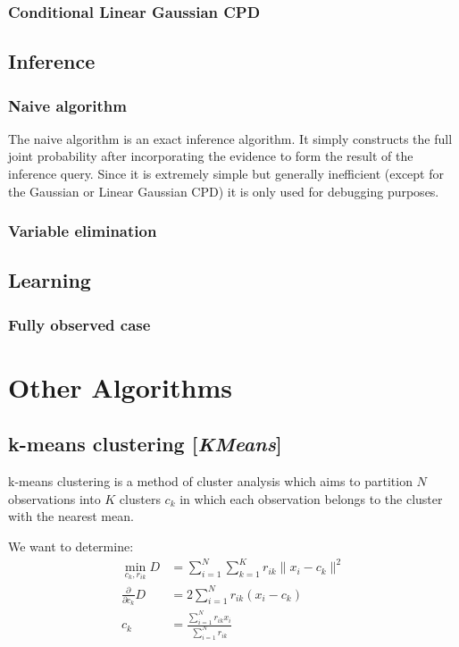\documentclass[11pt]{article}
\newcommand{\nllref}[1]{[\small{\textit{#1}}]}
\newcommand{\norm}[1]{\| #1 \|}
\begin{document}
\subsubsection{Conditional Linear Gaussian CPD}
\subsection{Inference}
\subsubsection{Naive algorithm}
The naive algorithm is an exact inference algorithm. It simply constructs the full joint probability after incorporating the evidence to form the result of the inference query. Since it is extremely simple but generally inefficient (except for the Gaussian or Linear Gaussian CPD) it is only used for debugging purposes.

\subsubsection{Variable elimination}
\subsection{Learning}
\subsubsection{Fully observed case}

\section{Other Algorithms}
\subsection{k-means clustering \nllref{KMeans}}
k-means clustering is a method of cluster analysis which aims to partition $N$ observations into $K$ clusters $c_k$ in which each observation belongs to the cluster with the nearest mean.

We want to determine:
\begin{align}
\min_{c_k,r_{ik}} D &= \sum_{i=1}^N\sum_{k=1}^K r_{ik} \norm{x_i-c_k}^2\nonumber\\
\frac{\partial}{\partial c_k}D &= 2 \sum_{i=1}^Nr_{ik}(x_i-c_k) \nonumber\\
c_k &= \frac{\sum_{i=1}^N r_{ik}x_i}{\sum_{i=1}^N r_{ik}} \label{kmeansUpdate}
\end{align}
\end{document}
